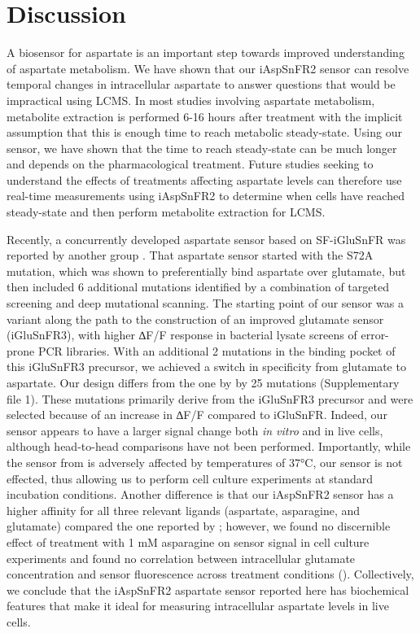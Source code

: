 \documentclass[9pt,lineno]{elife}
\begin{document}
\section{Discussion}
A biosensor for aspartate is an important step towards improved understanding of aspartate metabolism.
We have shown that our iAspSnFR2 sensor can resolve temporal changes in intracellular aspartate to answer questions that would be impractical using LCMS.
In most studies involving aspartate metabolism, metabolite extraction is performed 6-16 hours after treatment with the implicit assumption that this is enough time to reach metabolic steady-state.
Using our sensor, we have shown that the time to reach steady-state can be much longer and depends on the pharmacological treatment.
Future studies seeking to understand the effects of treatments affecting aspartate levels can therefore use real-time measurements using iAspSnFR2 to determine when cells have reached steady-state and then perform metabolite extraction for LCMS.

Recently, a concurrently developed aspartate sensor based on SF-iGluSnFR was reported by another group \citep{Hellweg2023}.
That aspartate sensor started with the S72A mutation, which was shown to preferentially bind aspartate over glutamate, but then included 6 additional mutations identified by a combination of targeted screening and deep mutational scanning.
The starting point of our sensor was a variant along the path to the construction of an improved glutamate sensor (iGluSnFR3), with higher ∆F/F response in bacterial lysate screens of error-prone PCR libraries.
With an additional 2 mutations in the binding pocket of this iGluSnFR3 precursor, we achieved a switch in specificity from glutamate to aspartate.
Our design differs from the one by \cite{Hellweg2023} by 25 mutations (Supplementary file 1).
These mutations primarily derive from the iGluSnFR3 precursor and were selected because of an increase in ∆F/F compared to iGluSnFR.
Indeed, our sensor appears to have a larger signal change both \textit{in vitro} and in live cells, although head-to-head comparisons have not been performed.
Importantly, while the sensor from \cite{Hellweg2023} is adversely affected by temperatures of 37°C, our sensor is not effected, thus allowing us to perform cell culture experiments at standard incubation conditions.
Another difference is that our iAspSnFR2 sensor has a higher affinity for all three relevant ligands (aspartate, asparagine, and glutamate) compared the one reported by \cite{Hellweg2023}; however, we found no discernible effect of treatment with 1 mM asparagine on sensor signal in cell culture experiments and found no correlation between intracellular glutamate concentration and sensor fluorescence across treatment conditions ().
Collectively, we conclude that the iAspSnFR2 aspartate sensor reported here has biochemical features that make it ideal for measuring intracellular aspartate levels in live cells.
\end{document}
